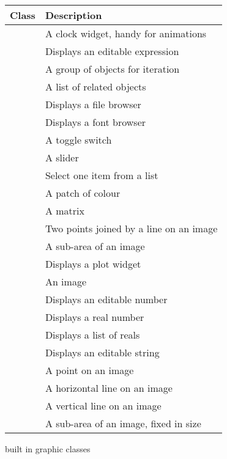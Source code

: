 \begin{tab2}
\begin{center}
\begin{tabular}{||l|l||}
\hline
Class & Description \\
\hline
\ct{Clock \emph{interval} \emph{value}}				& 
	A clock widget, handy for animations \\
\ct{Expression \emph{caption} \emph{expr}}			& 
	Displays an editable expression \\
\ct{Group \emph{value}}						& 
	A group of objects for iteration \\
\ct{List \emph{value}}						& 
	A list of related objects \\
\ct{Pathname \emph{caption} \emph{value}}			& 
	Displays a file browser \\
\ct{Fontname \emph{caption} \emph{value}}			& 
	Displays a font browser \\
\ct{Toggle \emph{caption} \emph{value}}				& 
	A toggle switch \\
\ct{Scale \emph{caption} \emph{from} \emph{to} \emph{value}}	& 
	A slider \\
\ct{Option \emph{caption} \emph{labels} \emph{value}}		& 
	Select one item from a list \\
\ct{Colour \emph{colour\_space} \emph{value}}			& 
	A patch of colour \\
\ct{Matrix\_vips \emph{value} \emph{scale} \emph{offset} \emph{filename} 
	\emph{display}}						& 
	A matrix \\
\ct{Arrow \emph{image} \emph{left} \emph{top} \emph{width} \emph{height}} & 
	Two points joined by a line on an image \\
\ct{Region \emph{image} \emph{left} \emph{top} \emph{width} \emph{height}} & 
	A sub-area of an image \\
\ct{Plot \emph{options} \emph{value}}				& 
	Displays a plot widget \\
\ct{Image \emph{value}}						& 
	An image \\
\ct{Number \emph{caption} \emph{value}}				& 
	Displays an editable number \\
\ct{Real \emph{value}}						& 
	Displays a real number \\
\ct{Vector \emph{value}}					& 
	Displays a list of reals \\
\ct{String \emph{caption} \emph{value}}				& 
	Displays an editable string \\
\ct{Mark \emph{image} \emph{left} \emph{top}} 			& 
	A point on an image \\
\ct{HGuide \emph{image} \emph{top}} 				& 
	A horizontal line on an image \\
\ct{VGuide \emph{image} \emph{left}} 				& 
	A vertical line on an image \\
\ct{Area \emph{image} \emph{left} \emph{top} \emph{width} \emph{height}} & 
	A sub-area of an image, fixed in size \\
\hline
\end{tabular}
\end{center}
\caption{\nip{} built in graphic classes}
\end{tab2}

